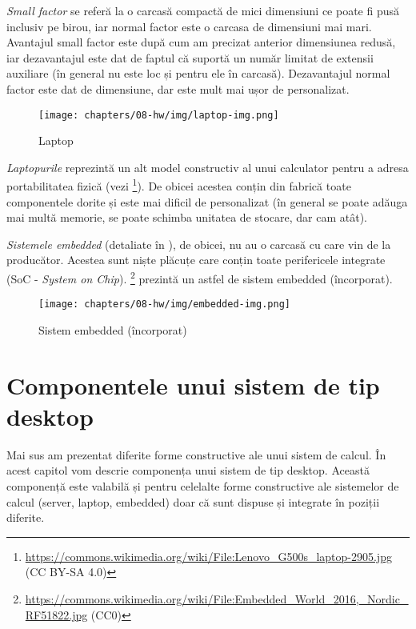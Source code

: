 \textit{Small factor} se referă la o carcasă compactă de mici dimensiuni ce poate fi pusă inclusiv pe birou, iar normal factor este o carcasa de dimensiuni mai mari.
Avantajul small factor este după cum am precizat anterior dimensiunea redusă, iar dezavantajul este dat de faptul că suportă un număr limitat de extensii auxiliare (în general nu este loc și pentru ele în carcasă).
Dezavantajul normal factor este dat de dimensiune, dar este mult mai ușor de personalizat.

\begin{figure}[!htbp]
  \centering
  \texttt{[image: chapters/08-hw/img/laptop-img.png]}
  \caption{Laptop}
  \label{fig:hw:laptop}
\end{figure}

\textit{Laptopurile} reprezintă un alt model constructiv al unui calculator pentru a adresa portabilitatea fizică (vezi \footnote{\url{https://commons.wikimedia.org/wiki/File:Lenovo_G500s_laptop-2905.jpg} (CC BY-SA 4.0)}).
De obicei acestea conțin din fabrică toate componentele dorite și este mai dificil de personalizat (în general se poate adăuga mai multă memorie, se poate schimba unitatea de stocare, dar cam atât).

\textit{Sistemele embedded} (detaliate în ), de obicei, nu au o carcasă cu care vin de la producător.
Acestea sunt niște plăcuțe care conțin toate perifericele integrate (SoC - \textit{System on Chip}).
\footnote{\url{https://commons.wikimedia.org/wiki/File:Embedded_World_2016,_Nordic_RF51822.jpg} (CC0)} prezintă un astfel de sistem embedded (încorporat).

\begin{figure}[!htbp]
  \centering
  \texttt{[image: chapters/08-hw/img/embedded-img.png]}
  \caption{Sistem embedded (încorporat)}
  \label{fig:hw:embed}
\end{figure}

\section{Componentele unui sistem de tip desktop}
\label{sec:hw:components}

Mai sus am prezentat diferite forme constructive ale unui sistem de calcul.
În acest capitol vom descrie componența unui sistem de tip desktop.
Această componență este valabilă și pentru celelalte forme constructive ale sistemelor de calcul (server, laptop, embedded) doar că sunt dispuse și integrate în poziții diferite.

